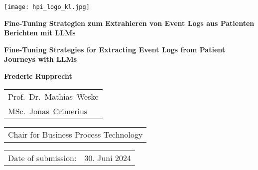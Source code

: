 \begin{titlepage}
	\begin{flushright}
		\texttt{[image: hpi\_logo\_kl.jpg]}
	\end{flushright}
	\begin{center}
		\hbox{}
		\vfill
		{\huge\bfseries Fine-Tuning Strategien zum Extrahieren von Event Logs aus Patienten Berichten mit LLMs \par}
		\vskip 0.5cm
		{\huge\bfseries Fine-Tuning Strategies for Extracting Event Logs from Patient Journeys with LLMs \par}
		\vskip 1.5cm
		\textbf{Frederic Rupprecht}\\
		\vskip 1.5cm
		\begin{tabular}{l}
			Prof.~Dr.~Mathias~Weske \\
			MSc.~Jonas~Crimerius \\
		\end{tabular}
		\vskip 0.25cm
		\begin{tabular}{l}
			Chair for  Business Process Technology
		\end{tabular}
		\vskip 1.5cm
		\begin{tabular}{ll}
			Date of submission: & 30. Juni 2024 \\
		\end{tabular}
	\end{center}	
	\vfill
\end{titlepage}

